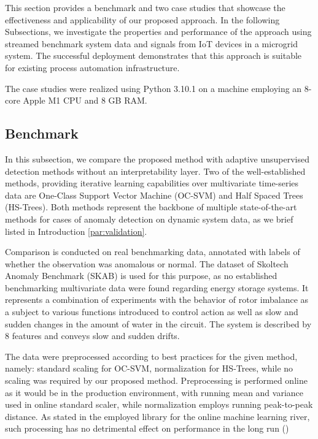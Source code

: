 This section provides a benchmark and two case studies that showcase the effectiveness and applicability of our proposed approach. In the following Subsections, we investigate the properties and performance of the approach using streamed benchmark system data and signals from IoT devices in a microgrid system. The successful deployment demonstrates that this approach is suitable for existing process automation infrastructure.

The case studies were realized using Python 3.10.1 on a machine employing an 8-core Apple M1 CPU and 8 GB RAM.

\subsection{Benchmark}\label{AA:Benchmark}
In this subsection, we compare the proposed method with adaptive unsupervised detection methods without an interpretability layer. Two of the well-established methods, providing iterative learning capabilities over multivariate time-series data are One-Class Support Vector Machine (OC-SVM) and Half Spaced Trees (HS-Trees). Both methods represent the backbone of multiple state-of-the-art methods for cases of anomaly detection on dynamic system data, as we brief listed in Introduction \ref{par:validation}.

Comparison is conducted on real benchmarking data, annotated with labels of whether the observation was anomalous or normal. The dataset of Skoltech Anomaly Benchmark (SKAB) \cite{skab2020} is used for this purpose, as no established benchmarking multivariate data were found regarding energy storage systems. It represents a combination of experiments with the behavior of rotor imbalance as a subject to various functions introduced to control action as well as slow and sudden changes in the amount of water in the circuit. The system is described by 8 features and conveys slow and sudden drifts.

The data were preprocessed according to best practices for the given method, namely: standard scaling for OC-SVM, normalization for HS-Trees, while no scaling was required by our proposed method. Preprocessing is performed online as it would be in the production environment, with running mean and variance used in online standard scaler, while normalization employs running peak-to-peak distance. As stated in the employed library for the online machine learning river, such processing has no detrimental effect on performance in the long run (\cite{Montiel2021})


